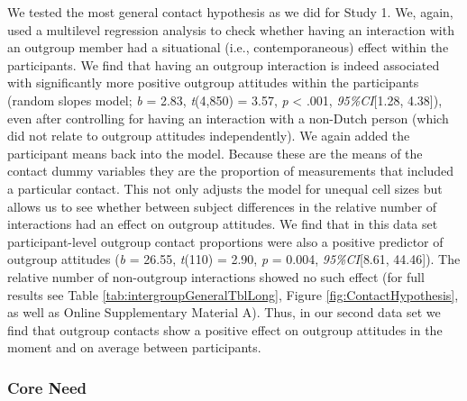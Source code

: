 We tested the most general contact hypothesis as we did for Study 1. We,
again, used a multilevel regression analysis to check whether having an
interaction with an outgroup member had a situational (i.e.,
contemporaneous) effect within the participants. We find that having an
outgroup interaction is indeed associated with significantly more
positive outgroup attitudes within the participants (random slopes
model; \textit{b} = 2.83, \textit{t}(4,850) = 3.57, \textit{p}
\textless{} .001, \textit{95\%CI}{[}1.28, 4.38{]}), even after
controlling for having an interaction with a non-Dutch person (which did
not relate to outgroup attitudes independently). We again added the
participant means back into the model. Because these are the means of
the contact dummy variables they are the proportion of measurements that
included a particular contact. This not only adjusts the model for
unequal cell sizes but allows us to see whether between subject
differences in the relative number of interactions had an effect on
outgroup attitudes. We find that in this data set participant-level
outgroup contact proportions were also a positive predictor of outgroup
attitudes (\textit{b} = 26.55, \textit{t}(110) = 2.90, \textit{p} =
0.004, \textit{95\%CI}{[}8.61, 44.46{]}). The relative number of
non-outgroup interactions showed no such effect (for full results see
Table \ref{tab:intergroupGeneralTblLong}, Figure
\ref{fig:ContactHypothesis}, as well as Online Supplementary Material
A). Thus, in our second data set we find that outgroup contacts show a
positive effect on outgroup attitudes in the moment and on average
between participants.

\subsubsection{Core Need}

